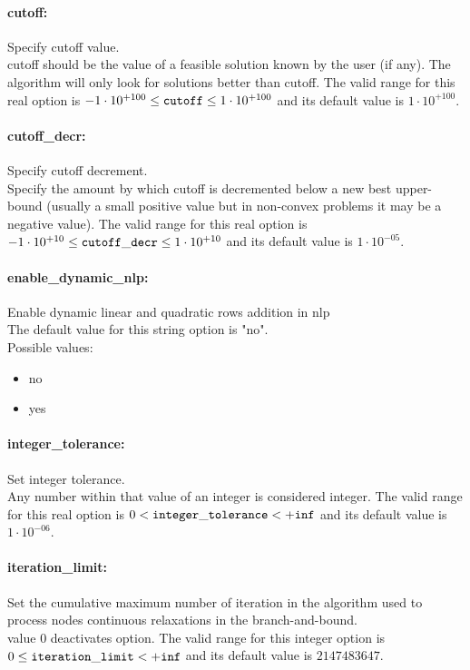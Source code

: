 \paragraph{cutoff:}\label{opt:cutoff} Specify cutoff value. \\
 cutoff should be the value of a feasible solution known by the user (if any). The algorithm will only look for solutions better than cutoff. The valid range for this real option is 
$-1 \cdot 10^{+100} \le {\tt cutoff } \le 1 \cdot 10^{+100}$
and its default value is $1 \cdot 10^{+100}$.


\paragraph{cutoff\_decr:}\label{opt:cutoff_decr} Specify cutoff decrement. \\
 Specify the amount by which cutoff is decremented below a new best upper-bound (usually a small positive value but in non-convex problems it may be a negative value). The valid range for this real option is 
$-1 \cdot 10^{+10} \le {\tt cutoff\_decr } \le 1 \cdot 10^{+10}$
and its default value is $1 \cdot 10^{-05}$.


\paragraph{enable\_dynamic\_nlp:}\label{opt:enable_dynamic_nlp} Enable dynamic linear and quadratic rows addition in nlp \\
 The default value for this string option is "no".
\\ 
Possible values:
\begin{itemize}
   \item no
   \item yes
\end{itemize}

\paragraph{integer\_tolerance:}\label{opt:integer_tolerance} Set integer tolerance. \\
 Any number within that value of an integer is considered integer. The valid range for this real option is 
$0 <  {\tt integer\_tolerance } <  {\tt +inf}$
and its default value is $1 \cdot 10^{-06}$.


\paragraph{iteration\_limit:}\label{opt:iteration_limit} Set the cumulative maximum number of iteration in the algorithm used to process nodes continuous relaxations in the branch-and-bound. \\
 value 0 deactivates option. The valid range for this integer option is
$0 \le {\tt iteration\_limit } <  {\tt +inf}$
and its default value is $2147483647$.


